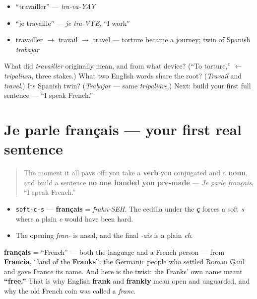\begin{itemize}
\raggedright
  \item \textquotedblleft{}travailler\textquotedblright{} — \emph{tra-va-YAY}
  \item \textquotedblleft{}je travaille\textquotedblright{} — \emph{je tra-VYE}, \textquotedblleft{}I work\textquotedblright{}
  \item travailler $\to$ travail $\to$ travel — torture became a journey; twin of Spanish \emph{trabajar}
\end{itemize}

\begin{tcolorbox}[breakable,colback=teal!4,colframe=teal!35!black,title={Before you move on}]
What did \emph{travailler} originally mean, and from what device? (\textquotedblleft{}To torture,\textquotedblright{} $\leftarrow$ \emph{tripalium}, three stakes.) What two English words share the root? (\emph{Travail} and \emph{travel}.) Its Spanish twin? (\emph{Trabajar} — same \emph{tripaliāre}.) Next: build your first full sentence — \textquotedblleft{}I speak French.\textquotedblright{}
\end{tcolorbox}
\section[Je parle français]{Je parle français — your first real sentence}

\label{lesson:FR-C05-je-parle-francais}



\begin{quote}
The moment it all pays off: you take a \textbf{verb} you conjugated and a \textbf{noun}, and build a sentence \textbf{no one handed you pre-made} — \emph{Je parle français}, \textquotedblleft{}I speak French.\textquotedblright{}
\end{quote}

\begin{sounds}
\begin{itemize}
\raggedright
  \item \texttt{soft-c-s} — \textbf{français} = \emph{frahn-SEH}. The cedilla under the \textbf{ç} forces a soft \emph{s} where a plain \emph{c} would have been hard.
  \item The opening \emph{fran-} is nasal, and the final \emph{-ais} is a plain \emph{eh}.
\end{itemize}
\end{sounds}

\begin{cousinweb}
\textbf{français} = \textquotedblleft{}French\textquotedblright{} — both the language and a French person — from \textbf{Francia}, \textquotedblleft{}land of the \textbf{Franks}\textquotedblright{}: the Germanic people who settled Roman Gaul and gave France its name. And here is the twist: the Franks' own name meant \textbf{\textquotedblleft{}free.\textquotedblright{}} That is why English \textbf{frank} and \textbf{frankly} mean open and unguarded, and why the old French coin was called a \emph{franc}.
\end{cousinweb}

